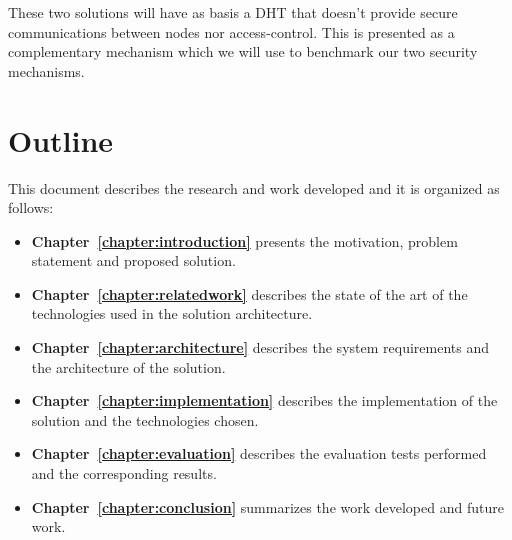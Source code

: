 These two solutions will have as basis a \ac{DHT} that doesn't provide secure communications between nodes nor access-control.
This is presented as a complementary mechanism which we will use to benchmark our two security mechanisms.

\section{Outline}
This document describes the research and work developed and it is organized as follows:

\begin{itemize}
  \item \textbf{Chapter~\ref{chapter:introduction}} presents the motivation, problem statement and proposed solution.
  \item \textbf{Chapter~\ref{chapter:relatedwork}} describes the state of the art of the technologies used in the solution architecture.
  \item \textbf{Chapter~\ref{chapter:architecture}} describes the system requirements and the architecture of the solution.
  \item \textbf{Chapter~\ref{chapter:implementation}} describes the implementation of the solution and the technologies chosen.
  \item \textbf{Chapter~\ref{chapter:evaluation}} describes the evaluation tests performed and the corresponding results.
  \item \textbf{Chapter~\ref{chapter:conclusion}} summarizes the work developed and future work.
\end{itemize}

\cleardoublepage
